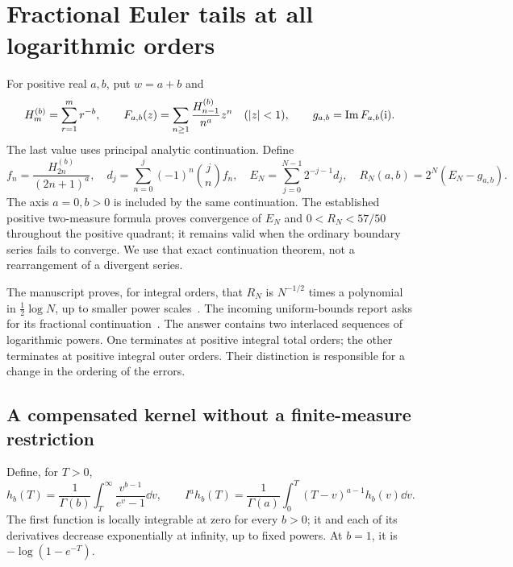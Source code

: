 \section{Fractional Euler tails at all logarithmic orders}
\label{frac:sec:main}

For positive real $a,b$, put $w=a+b$ and
\[
 H_m^{(b)}=\sum_{r=1}^m r^{-b},\qquad
 F_{a,b}(z)=\sum_{n\ge1}\frac{H_{n-1}^{(b)}}{n^a}z^n
 \quad(|z|<1),\qquad g_{a,b}=\operatorname{Im} F_{a,b}(\mathrm i).
\]
The last value uses principal analytic continuation. Define
\begin{equation}\label{frac:eq:defs}
 f_n=\frac{H_{2n}^{(b)}}{(2n+1)^a},\quad
 d_j=\sum_{n=0}^j(-1)^n\binom jn f_n,\quad
 E_N=\sum_{j=0}^{N-1}2^{-j-1}d_j,\quad
 R_N(a,b)=2^N(E_N-g_{a,b}).
\end{equation}
The axis $a=0,b>0$ is included by the same continuation. The established
positive two-measure formula proves convergence of $E_N$ and
$0<R_N<57/50$ throughout the positive quadrant; it remains valid when
the ordinary boundary series fails to converge. We use that exact
continuation theorem, not a rearrangement of a divergent series.

The manuscript proves, for integral orders, that $R_N$ is
$N^{-1/2}$ times a polynomial in $\tfrac12\log N$, up to smaller
power scales~\cite{baseline}. The incoming uniform-bounds report asks
for its fractional continuation~\cite{incoming-bounds}. The answer
contains two interlaced sequences of logarithmic powers. One terminates
at positive integral total orders; the other terminates at positive
integral outer orders. Their distinction is responsible for a change
in the ordering of the errors.

\subsection{A compensated kernel without a finite-measure restriction}

Define, for $T>0$,
\begin{equation}\label{frac:eq:h}
 h_b(T)=\frac1{\Gamma(b)}\int_T^\infty
                      \frac{v^{b-1}}{e^v-1}\dd v,
 \qquad
 I^ah_b(T)=\frac1{\Gamma(a)}\int_0^T(T-v)^{a-1}h_b(v)\dd v.
\end{equation}
The first function is locally integrable at zero for every $b>0$;
it and each of its derivatives decrease exponentially at infinity,
up to fixed powers. At $b=1$, it is $-\log(1-e^{-T})$.

